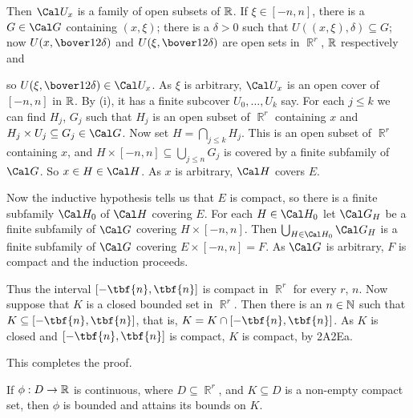 { 
 
\noindent Then $\Cal U_x$ is a family of open subsets of $\Bbb R$.   If 
$\xi\in[-n,n]$, there is a $G\in\Cal G$ containing $(x,\xi)$;  there is 
a $\delta>0$ such that $U((x,\xi),\delta)\subseteq G$;  now 
$U(x,\bover12\delta)$ and $U(\xi,\bover12\delta)$ are open sets in 
$\BbbR^r$, $\Bbb R$ respectively and 
 
 
\noindent so $U(\xi,\bover12\delta)\in\Cal U_x$.   As $\xi$ is 
arbitrary, $\Cal U_x$ is an open cover of $[-n,n]$ in $\Bbb R$.   By 
(i), it has a finite subcover $U_0,\ldots,U_k$ say.   For each $j\le k$ 
we can find $H_j$, $G_j$ such that $H_j$ is an open subset of $\BbbR^r$ 
containing $x$ and $H_j\times U_j\subseteq G_j\in\Cal G$.   Now set 
$H=\bigcap_{j\le k}H_j$.  This is an open subset of $\BbbR^r$ 
containing $x$, and $H\times[-n,n]\subseteq\bigcup_{j\le n}G_j$ is 
covered by a finite subfamily of $\Cal G$.   So $x\in H\in\Cal H$.   As 
$x$ is arbitrary, $\Cal H$ covers $E$.   \Qed 
 
\medskip 
 
 Now the inductive hypothesis tells us that $E$ is 
compact, so there is a finite subfamily $\Cal H_0$ of $\Cal H$ covering 
$E$.   For each $H\in\Cal H_0$ let $\Cal G_H$ be a finite subfamily of 
$\Cal G$ covering $H\times[-n,n]$.   Then $\bigcup_{H\in\Cal H_0}\Cal 
G_H$ is a finite subfamily of $\Cal G$ covering $E\times[-n,n]=F$.   As 
$\Cal G$ is arbitrary, $F$ is compact and the induction proceeds. 
 
\medskip 
 
 Thus the interval $[-\tbf{n},\tbf{n}]$ is compact in 
$\BbbR^r$ for every $r$, $n$.   Now suppose that $K$ is a closed 
bounded set in $\BbbR^r$.   Then there is an $n\in\Bbb N$ such that 
$K\subseteq[-\tbf{n},\tbf{n}]$, that is, $K=K\cap[-\tbf{n},\tbf{n}]$. 
As $K$ is closed and $[-\tbf{n},\tbf{n}]$ is compact, $K$ is compact, by 
2A2Ea. 
 
This completes the proof. 
}%
 
 If $\phi:D\to\Bbb R$ is continuous, where 
$D\subseteq\BbbR^r$, and $K\subseteq D$ is a non-empty compact set, 
then $\phi$ is bounded and attains its bounds on $K$. 
 
